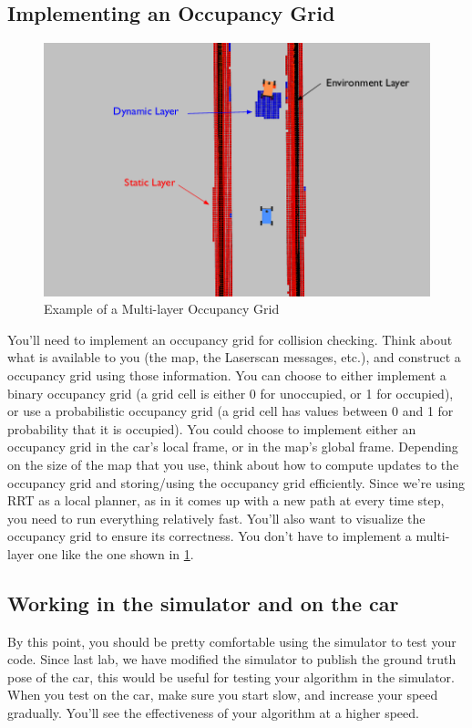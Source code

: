\documentclass[letta4 paper]{article}
\numberwithin{equation}{section}
\newcommand{\0}{\mathbf{0}}
\begin{document}
	\subsection{Implementing an Occupancy Grid}
	\begin{figure}[!hb]
		\begin{center}
			\includegraphics[scale=0.35]{grid_map_annotated.png}
		\end{center}
		\caption{Example of a Multi-layer Occupancy Grid}
		\label{fig:occgrid}
	\end{figure}
	You'll need to implement an occupancy grid for collision checking. Think about what is available to you (the map, the Laserscan messages, etc.), and construct a occupancy grid using those information. You can choose to either implement a binary occupancy grid (a grid cell is either 0 for unoccupied, or 1 for occupied), or use a probabilistic occupancy grid (a grid cell has values between 0 and 1 for probability that it is occupied). You could choose to implement either an occupancy grid in the car's local frame, or in the map's global frame. Depending on the size of the map that you use, think about how to compute updates to the occupancy grid and storing/using the occupancy grid efficiently. Since we're using RRT as a local planner, as in it comes up with a new path at every time step, you need to run everything relatively fast.  You'll also want to visualize the occupancy grid to ensure its correctness. You don't have to implement a multi-layer one like the one shown in \ref{fig:occgrid}.
	
	\subsection{Working in the simulator and on the car}
	By this point, you should be pretty comfortable using the simulator to test your code. Since last lab, we have modified the simulator to publish the ground truth pose of the car, this would be useful for testing your algorithm in the simulator. When you test on the car, make sure you start slow, and increase your speed gradually. You'll see the effectiveness of your algorithm at a higher speed.\\
	
\end{document}
